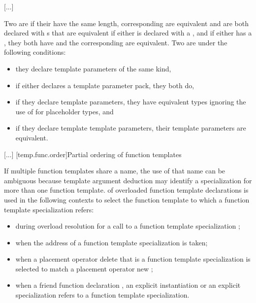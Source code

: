 \documentclass{wg21}
\begin{document}
\textcolor{noteclr}{[...]}

\pnum
Two  are
 if
their  have the same length,
corresponding  are equivalent
and are both declared with s that are equivalent
if either 
is declared with a ,
and if either  has a ,
they both have
 and the corresponding
 are equivalent.
Two  are
under the following conditions:
\begin{itemize}
    \item they declare template parameters of the same kind,
    \item if either declares a template parameter pack, they both do,
    \item if they declare  template parameters,
    they have equivalent types
    ignoring the use of  for placeholder types, and
    \item if they declare template template parameters, their template
    parameters are equivalent.
\end{itemize}

\textcolor{noteclr}{[...]}
[temp.func.order]{Partial ordering of function templates}

\pnum
{}%
%
If multiple function templates share a name,
the use of that name can be ambiguous because
template argument deduction  may identify
a specialization for more than one function template.
of overloaded function template declarations is used in the following contexts
to select the function template to which a function template specialization
refers:
\begin{itemize}
    \item
    during overload resolution for a call to a function template specialization ;
    \item
    when the address of a function template specialization is taken;
    \item
    when a placement operator delete that is a
    function template
    specialization
    is selected to match a placement operator new
    ;
    \item
    when a friend function declaration , an
    explicit instantiation  or an explicit specialization  refers to
    a function template specialization.
\end{itemize}
\end{document}
